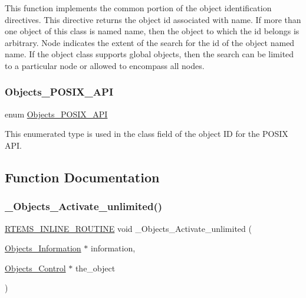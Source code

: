 This function implements the common portion of the object identification directives. This directive returns the object id associated with name. If more than one object of this class is named name, then the object to which the id belongs is arbitrary. Node indicates the extent of the search for the id of the object named name. If the object class supports global objects, then the search can be limited to a particular node or allowed to encompass all nodes. \mbox{\label{group__RTEMSScoreObject_gaa08d967fe7c8ab07e1c9f9dfec70b01f}} 
\subsubsection{\texorpdfstring{Objects\_POSIX\_API}{Objects\_POSIX\_API}}
{\footnotesize\ttfamily enum \mbox{\hyperlink{group__RTEMSScoreObject_gaa08d967fe7c8ab07e1c9f9dfec70b01f}{Objects\+\_\+\+P\+O\+S\+I\+X\+\_\+\+A\+PI}}}

This enumerated type is used in the class field of the object ID for the P\+O\+S\+IX A\+PI. 

\subsection{Function Documentation}
\mbox{\label{group__RTEMSScoreObject_gacbd8e518804904ffb1591e64830cf89f}} 
\subsubsection{\texorpdfstring{\_Objects\_Activate\_unlimited()}{\_Objects\_Activate\_unlimited()}}
{\footnotesize\ttfamily \mbox{\hyperlink{group__RTEMSScoreBaseDefs_gac216239df231d5dbd15e3520b0b9313f}{R\+T\+E\+M\+S\+\_\+\+I\+N\+L\+I\+N\+E\+\_\+\+R\+O\+U\+T\+I\+NE}} void \+\_\+\+Objects\+\_\+\+Activate\+\_\+unlimited (\begin{DoxyParamCaption}\item[{\mbox{\hyperlink{structObjects__Information}{Objects\+\_\+\+Information}} $\ast$}]{information,  }\item[{\mbox{\hyperlink{structObjects__Control}{Objects\+\_\+\+Control}} $\ast$}]{the\+\_\+object }\end{DoxyParamCaption})}



